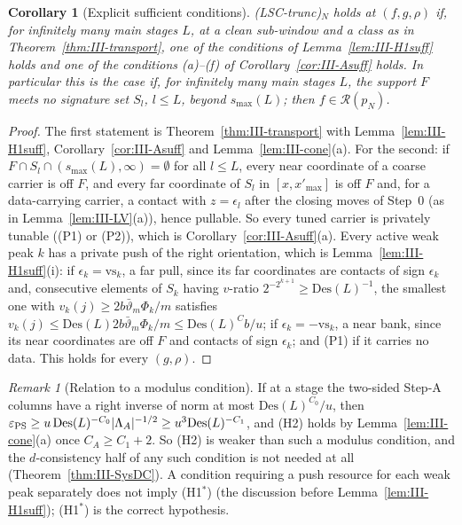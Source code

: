 \documentclass[10pt]{amsart}
\newtheorem{corollary}[theorem]{Corollary}
\theoremstyle{definition}
\theoremstyle{remark}
\newtheorem{remark}[theorem]{Remark}
\newcommand{\Rec}{\mathcal R}
\begin{document}
\begin{corollary}[Explicit sufficient conditions]\label{cor:III-transport}
\textup{(LSC-trunc)}$_N$ holds at $(f,g,\rho)$ if, for infinitely many main
stages $L$, at a clean sub-window and a class as in
Theorem~\textup{\ref{thm:III-transport}}, one of the conditions of
Lemma~\textup{\ref{lem:III-H1suff}} holds and one of the conditions
\textup{(a)}--\textup{(f)} of Corollary~\textup{\ref{cor:III-Asuff}} holds.  In
particular this is the case if, for infinitely many main stages $L$, the support
$F$ meets no signature set $S_l$, $l\le L$, beyond $s_{\max}(L)$; then
$f\in\Rec(p_N)$.
\end{corollary}

\begin{proof}
The first statement is Theorem~\ref{thm:III-transport} with
Lemma~\ref{lem:III-H1suff}, Corollary~\ref{cor:III-Asuff} and
Lemma~\ref{lem:III-cone}(a).  For the second: if $F\cap S_l\cap(s_{\max}(L),
\infty)=\emptyset$ for all $l\le L$, every near coordinate of a coarse carrier
is off $F$, and every far coordinate of $S_l$ in $[x,x'_{\max}]$ is off $F$ and,
for a data-carrying carrier, a contact with $z=\epsilon_l$ after the closing
moves of Step~0 (as in Lemma~\ref{lem:III-LV}(a)), hence pullable.  So every
tuned carrier is privately tunable ((P1) or (P2)), which is
Corollary~\ref{cor:III-Asuff}(a).  Every active weak peak $k$ has a private
push of the right orientation, which is Lemma~\ref{lem:III-H1suff}(i): if
$\epsilon_k=\mathrm{vs}_k$, a far pull, since its far coordinates are contacts
of sign $\epsilon_k$ and, consecutive elements of $S_k$ having $v$-ratio
$2^{-2^{k+1}}\ge\mathrm{Des}(L)^{-1}$, the smallest one with $v_k(j)\ge2b\bar
\vartheta_m\Phi_k/m$ satisfies $v_k(j)\le\mathrm{Des}(L)2b\bar\vartheta_m
\Phi_k/m\le\mathrm{Des}(L)^Cb/u$; if $\epsilon_k=-\mathrm{vs}_k$, a near bank,
since its near coordinates are off $F$ and contacts of sign $\epsilon_k$; and
(P1) if it carries no data.  This holds for every $(g,\rho)$.
\end{proof}

\begin{remark}[Relation to a modulus condition]\label{rem:III-LR}
If at a stage the two-sided Step-A columns have a right inverse of norm at most
$\mathrm{Des}(L)^{C_0}/u$, then $\varepsilon_{\rm PS}\ge u\,\mathrm{Des}(L)^{-C_0}
|\Lambda_A|^{-1/2}\ge u^3\mathrm{Des}(L)^{-C_1}$, and (H2) holds by
Lemma~\ref{lem:III-cone}(a) once $C_A\ge C_1+2$.  So (H2) is weaker than such a
modulus condition, and the $d$-consistency half of any such condition is not
needed at all (Theorem~\ref{thm:III-SysDC}).  A condition requiring a push
resource for each weak peak separately does not imply (H1$^*$) (the discussion
before Lemma~\ref{lem:III-H1suff}); (H1$^*$) is the correct hypothesis.
\end{remark}
\end{document}
